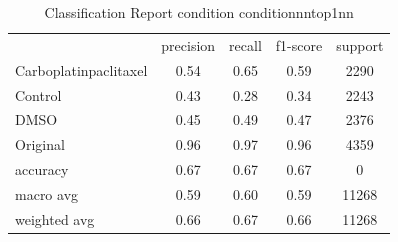 \begin{table}[htbp]
\centering
\caption{Classification Report condition conditionnntop1nn}
\label{tab:classificationreport.condition.conditionnntop1nn}
\begin{tabular}{lcccc}
 & precision & recall & f1-score & support \\
Carboplatinpaclitaxel & 0.54 & 0.65 & 0.59 & 2290 \\
Control & 0.43 & 0.28 & 0.34 & 2243 \\
DMSO & 0.45 & 0.49 & 0.47 & 2376 \\
Original & 0.96 & 0.97 & 0.96 & 4359 \\
accuracy & 0.67 & 0.67 & 0.67 & 0 \\
macro avg & 0.59 & 0.60 & 0.59 & 11268 \\
weighted avg & 0.66 & 0.67 & 0.66 & 11268 \\
\end{tabular}
\end{table}
